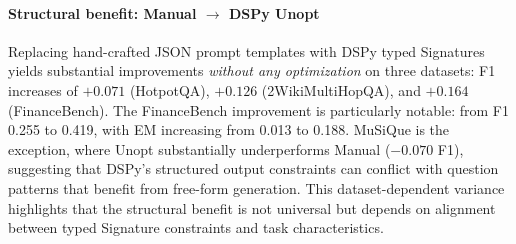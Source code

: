 \begin{table}[t]
\centering
\caption{DSPy optimization results (RQ5, Gemini Flash Lite). ``Manual'' uses hand-crafted JSON templates; ``Unopt'' uses DSPy typed Signatures without optimization; Bootstrap and MIPROv2 add automatic few-shot/instruction optimization. Best per dataset in \textbf{bold}. $N$: test set size after train/validation split.}
\label{tab:rq5}
\end{table}

\paragraph{Structural benefit: Manual $\to$ DSPy Unopt}
Replacing hand-crafted JSON prompt templates with DSPy typed Signatures yields substantial improvements \emph{without any optimization} on three datasets: F1 increases of $+0.071$ (HotpotQA), $+0.126$ (2WikiMultiHopQA), and $+0.164$ (FinanceBench).
The FinanceBench improvement is particularly notable: from F1 0.255 to 0.419, with EM increasing from 0.013 to 0.188.
MuSiQue is the exception, where Unopt substantially underperforms Manual ($-0.070$ F1), suggesting that DSPy's structured output constraints can conflict with question patterns that benefit from free-form generation.
This dataset-dependent variance highlights that the structural benefit is not universal but depends on alignment between typed Signature constraints and task characteristics.

